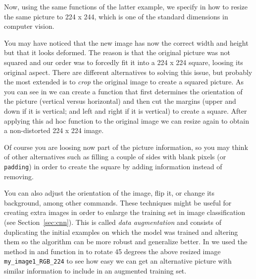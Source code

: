 
Now, using the same functions of the latter example, we specify in  how to resize the same picture to 224 x 244, which is one of the standard dimensions in computer vision. 


You may have noticed that the new image has now the correct width and height but that it looks deformed. The reason is that the original picture was not squared and our order was to forcedly fit it into a 224 x 224 square, loosing its original aspect. There are different alternatives to solving this issue, but probably the most extended is to \textit{crop} the original image to create a squared picture. As you can see in  we can create a function that first determines the orientation of the picture (vertical versus horizontal) and then cut the margins (upper and down if it is vertical; and left and right if it is vertical) to create a square. After applying this ad hoc function  to the original image we can resize again to obtain a non-distorted 224 x 224 image.

Of course you are loosing now part of the picture information, so you may think of other alternatives such as filling a couple of sides with blank pixels (or \texttt{padding}) in order to create the square by adding information instead of removing.


You can also adjust the orientation of the image, flip it, or change its background, among other commands. These techniques might be useful for creating extra images in order to enlarge the training set in image classification (see Section~\ref{sec:cnn}). This is called \textit{data augmentation} and consists of duplicating the initial examples on which the model was trained and altering them so the algorithm can be more robust and generalize better. In  we used the  method in  and  function in  to rotate 45 degrees the above resized image \texttt{my\_image1\_RGB\_224} to see how easy we can get an alternative picture with similar information to include in an augmented training set.

